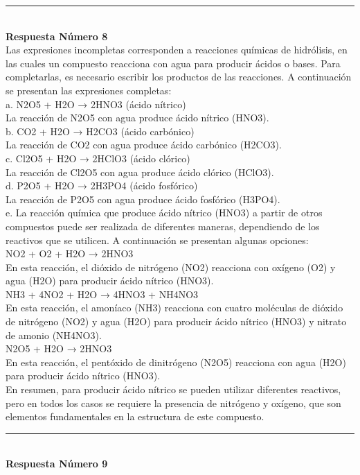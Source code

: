 \documentclass{article}
\begin{document}
\noindent\rule{\textwidth}{1pt} \\
\textbf{Respuesta Número 8} \\
Las expresiones incompletas corresponden a reacciones químicas de hidrólisis, en las cuales un compuesto reacciona con agua para producir ácidos o bases. Para completarlas, es necesario escribir los productos de las reacciones. A continuación se presentan las expresiones completas:\\
a. N2O5 + H2O → 2HNO3 (ácido nítrico)\\
La reacción de N2O5 con agua produce ácido nítrico (HNO3).\\
b. CO2 + H2O → H2CO3 (ácido carbónico)\\
La reacción de CO2 con agua produce ácido carbónico (H2CO3).\\
c. Cl2O5 + H2O → 2HClO3 (ácido clórico)\\
La reacción de Cl2O5 con agua produce ácido clórico (HClO3).\\
d. P2O5 + H2O → 2H3PO4 (ácido fosfórico)\\
La reacción de P2O5 con agua produce ácido fosfórico (H3PO4).\\
e. La reacción química que produce ácido nítrico (HNO3) a partir de otros compuestos puede ser realizada de diferentes maneras, dependiendo de los reactivos que se utilicen. A continuación se presentan algunas opciones:\\
NO2 + O2 + H2O → 2HNO3\\
En esta reacción, el dióxido de nitrógeno (NO2) reacciona con oxígeno (O2) y agua (H2O) para producir ácido nítrico (HNO3).\\
NH3 + 4NO2 + H2O → 4HNO3 + NH4NO3\\
En esta reacción, el amoníaco (NH3) reacciona con cuatro moléculas de dióxido de nitrógeno (NO2) y agua (H2O) para producir ácido nítrico (HNO3) y nitrato de amonio (NH4NO3).\\
N2O5 + H2O → 2HNO3\\
En esta reacción, el pentóxido de dinitrógeno (N2O5) reacciona con agua (H2O) para producir ácido nítrico (HNO3).\\
En resumen, para producir ácido nítrico se pueden utilizar diferentes reactivos, pero en todos los casos se requiere la presencia de nitrógeno y oxígeno, que son elementos fundamentales en la estructura de este compuesto.\\
\noindent\rule{\textwidth}{1pt} \\
\textbf{Respuesta Número 9} \\
\end{document}
